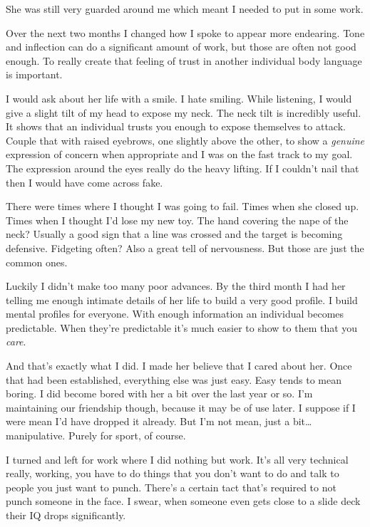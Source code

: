\noindent
She was still very guarded around me which meant I needed to put in some work.
\VV


\noindent
Over the next two months I changed how I spoke to appear more endearing.
Tone and inflection can do a significant amount of work, but those are often
not good enough.  To really create that feeling of trust in another individual
body language is important.


I would ask about her life with a smile.  I hate smiling.  While listening,
I would give a slight tilt of my head to expose my neck.  The neck tilt is
incredibly useful.  It shows that an individual trusts you enough to
expose themselves to attack. Couple that with raised eyebrows,
one slightly above the other, to show a \textit{genuine} expression of
concern when appropriate and I was on the fast track to my goal.
The expression around the eyes really do the heavy lifting.
If I couldn't nail that then I would have come across fake.


There were times where I thought I was going to fail.  Times when she
closed up.  Times when I thought I'd lose my new toy.
The hand covering the nape of the neck?  Usually a good sign
that a line was crossed and the target is becoming defensive.
Fidgeting often? Also a great tell of nervousness.
But those are just the common ones.


Luckily I didn't make too many poor advances.  By the third month I had her
telling me enough intimate details of her life to build a very good profile.
I build mental profiles for everyone. With enough information
an individual becomes predictable. When they're predictable it's much
easier to show to them that you \textit{care}.


And that's exactly what I did.  I made her believe that I cared about her.
Once that had been established, everything else was just easy.  Easy tends
to mean boring.  I did become bored with her a bit over the last year or so.
I'm maintaining our friendship though, because it may be of use later.
I suppose if I were mean I'd have dropped it already.  But I'm not mean,
just a bit\ldots{}manipulative.  Purely for sport, of course.
\VV


\noindent
I turned and left for work where I did nothing but work.
It's all very technical really, working, you have to do
things that you don't want to do and talk to people you
just want to punch.  There's a certain tact that's
required to not punch someone in the face.
I swear, when someone even gets close to a slide deck
their IQ drops significantly.


